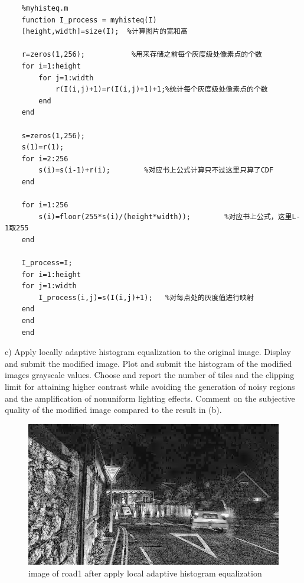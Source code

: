 \documentclass[
	12pt, %
]{fphw}
\begin{document}
\begin{lstlisting}
	%myhisteq.m
	function I_process = myhisteq(I)
	[height,width]=size(I);  %计算图片的宽和高

	r=zeros(1,256);           %用来存储之前每个灰度级处像素点的个数
	for i=1:height
		for j=1:width
			r(I(i,j)+1)=r(I(i,j)+1)+1;%统计每个灰度级处像素点的个数
		end
	end

	s=zeros(1,256);
	s(1)=r(1);
	for i=2:256
		s(i)=s(i-1)+r(i);        %对应书上公式计算只不过这里只算了CDF
	end

	for i=1:256
		s(i)=floor(255*s(i)/(height*width));        %对应书上公式，这里L-1取255
	end

	I_process=I;
	for i=1:height
	for j=1:width
		I_process(i,j)=s(I(i,j)+1);   %对每点处的灰度值进行映射
	end
	end
	end
\end{lstlisting}
\begin{problem}
	c)  Apply locally adaptive histogram equalization to the original image. Display
	and submit the modified image. Plot and submit the histogram of the modified images grayscale values. Choose
	and report the number of tiles and the clipping limit for attaining higher contrast while avoiding the generation
	of noisy regions and the amplification of nonuniform lighting effects. Comment on the subjective quality of the
	modified image compared to the result in (b).
\end{problem}
\begin{figure}[H]
 
	\centering
	\includegraphics[width=1\columnwidth]{T2/result/I1_local.jpg} 
	\caption{image of road1 after apply local adaptive histogram equalization}
	\label{fig16}
\end{figure}
\end{document}
